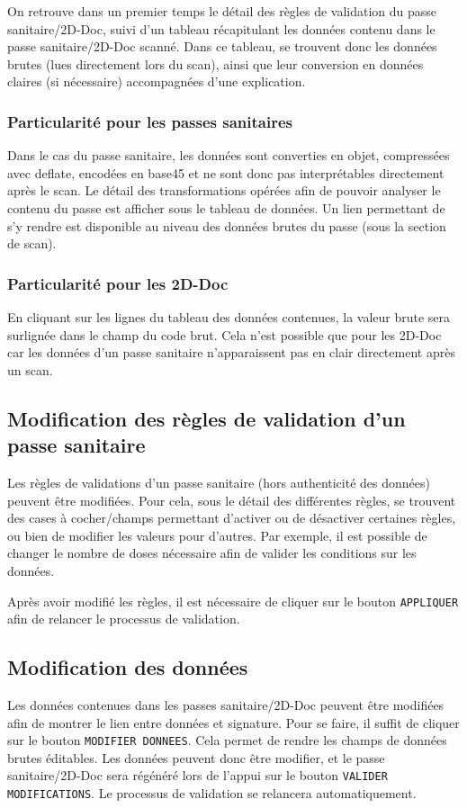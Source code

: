On retrouve dans un premier temps le détail des règles de validation du passe sanitaire/2D-Doc, suivi d'un tableau récapitulant les données contenu dans le passe sanitaire/2D-Doc scanné. Dans ce tableau, se trouvent donc les données brutes (lues directement lors du scan), ainsi que leur conversion en données claires (si nécessaire) accompagnées d'une explication.

\subsubsection{Particularité pour les passes sanitaires}
Dans le cas du passe sanitaire, les données sont converties en objet, compressées avec deflate, encodées en base45 et ne sont donc pas interprétables directement après le scan. Le détail des transformations opérées afin de pouvoir analyser le contenu du passe est afficher sous le tableau de données. Un lien permettant de s'y rendre est disponible au niveau des données brutes du passe (sous la section de scan).

\subsubsection{Particularité pour les 2D-Doc}
En cliquant sur les lignes du tableau des données contenues, la valeur brute sera surlignée dans le champ du code brut. Cela n'est possible que pour les 2D-Doc car les données d'un passe sanitaire n'apparaissent pas en clair directement après un scan.

\subsection{Modification des règles de validation d'un passe sanitaire}
Les règles de validations d'un passe sanitaire (hors authenticité des données) peuvent être modifiées. Pour cela, sous le détail des différentes règles, se trouvent des cases à cocher/champs permettant d'activer ou de désactiver certaines règles, ou bien de modifier les valeurs pour d'autres. Par exemple, il est possible de changer le nombre de doses nécessaire afin de valider les conditions sur les données.

Après avoir modifié les règles, il est nécessaire de cliquer sur le bouton \texttt{APPLIQUER} afin de relancer le processus de validation.

\subsection{Modification des données}
Les données contenues dans les passes sanitaire/2D-Doc peuvent être modifiées afin de montrer le lien entre données et signature. Pour se faire, il suffit de cliquer sur le bouton \texttt{MODIFIER DONNEES}. Cela permet de rendre les champs de données brutes éditables. Les données peuvent donc être modifier, et le passe sanitaire/2D-Doc sera régénéré lors de l'appui sur le bouton \texttt{VALIDER MODIFICATIONS}. Le processus de validation se relancera automatiquement.

